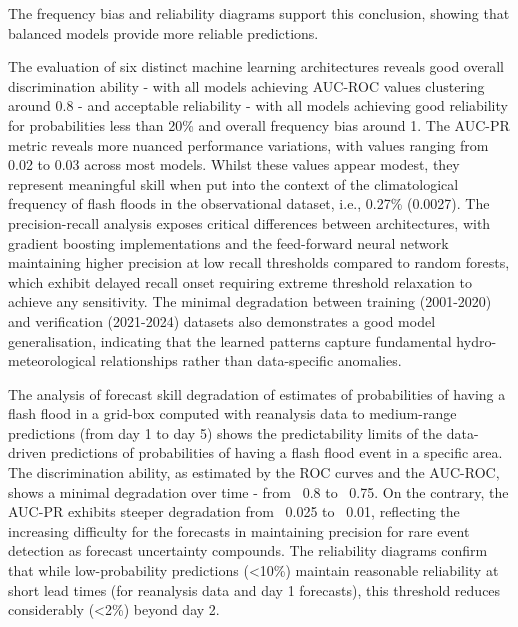 \documentclass[nhess, manuscript]{copernicus}
\begin{document}
The frequency bias and reliability diagrams support this conclusion, showing that balanced models provide more reliable predictions.

The evaluation of six distinct machine learning architectures reveals good overall discrimination ability - with all models achieving AUC-ROC values clustering around 0.8 - and acceptable reliability - with all models achieving good reliability for probabilities less than 20\% and overall frequency bias around 1. The AUC-PR metric reveals more nuanced performance variations, with values ranging from 0.02 to 0.03 across most models. Whilst these values appear modest, they represent meaningful skill when put into the context of the climatological frequency of flash floods in the observational dataset, i.e., 0.27\% (0.0027). The precision-recall analysis exposes critical differences between architectures, with gradient boosting implementations and the feed-forward neural network maintaining higher precision at low recall thresholds compared to random forests, which exhibit delayed recall onset requiring extreme threshold relaxation to achieve any sensitivity. The minimal degradation between training (2001-2020) and verification (2021-2024) datasets also demonstrates a good model generalisation, indicating that the learned patterns capture fundamental hydro-meteorological relationships rather than data-specific anomalies.

The analysis of forecast skill degradation of estimates of probabilities of having a flash flood in a grid-box computed with reanalysis data to medium-range predictions (from day 1 to day 5) shows the predictability limits of the data-driven predictions of probabilities of having a flash flood event in a specific area. The discrimination ability, as estimated by the ROC curves and the AUC-ROC, shows a minimal degradation over time - from ~0.8 to ~0.75. On the contrary, the AUC-PR exhibits steeper degradation from ~0.025 to ~0.01, reflecting the increasing difficulty for the forecasts in maintaining precision for rare event detection as forecast uncertainty compounds. The reliability diagrams confirm that while low-probability predictions (<10\%) maintain reasonable reliability at short lead times (for reanalysis data and day 1 forecasts), this threshold reduces considerably (<2\%) beyond day 2.
\end{document}
